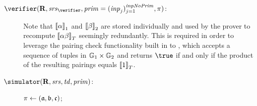 \begin{description}
\item[$\verifier (\REL, \srs_\verifier, \priminputs = (\inputs_j)_{j = 1}^{\inpnoprim}, \pi)$:]\hfill
  Note that $\left\llbracket {\alpha} \right\rrbracket_{1}$ and $\left\llbracket {\beta} \right\rrbracket_{2}$ are stored individually and used by the prover to recompute $\left\llbracket {\alpha \beta} \right\rrbracket_{T}$ seemingly redundantly. This is required in order to leverage the pairing check functionality built in to \ethereum, which accepts a sequence of tuples in $\mathbb{G}_1 \times \mathbb{G}_2$ and returns $\true$ if and only if the product of the resulting pairings equals $\left\llbracket {1} \right\rrbracket_{T}$.

\item[$\simulator(\REL, \srs, \td, \priminputs)$:]\hfill
  \pcreturn $\pi \gets (\mathfrak{a}, \mathfrak{b}, \mathfrak{c})$;
\end{description}
